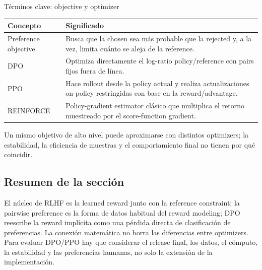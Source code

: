 \begin{knowledgebox}{Términos clave: objective y optimizer}
\begin{tabularx}{\textwidth}{L{0.18\textwidth} X}
\toprule
Concepto & Significado \\
\midrule
Preference objective & Busca que la chosen sea más probable que la rejected y, a la vez, limita cuánto se aleja de la reference. \\
DPO & Optimiza directamente el log-ratio policy/reference con pairs fijos fuera de línea. \\
PPO & Hace rollout desde la policy actual y realiza actualizaciones on-policy restringidas con base en la reward/advantage. \\
REINFORCE & Policy-gradient estimator clásico que multiplica el retorno muestreado por el score-function gradient. \\
\bottomrule
\end{tabularx}
Un mismo objetivo de alto nivel puede aproximarse con distintos optimizers; la estabilidad, la eficiencia de muestras y el comportamiento final no tienen por qué coincidir.
\end{knowledgebox}


\subsection{Resumen de la sección}

El núcleo de RLHF es la learned reward junto con la reference constraint; la pairwise preference es la forma de datos habitual del reward modeling; DPO reescribe la reward implícita como una pérdida directa de clasificación de preferencias. La conexión matemática no borra las diferencias entre optimizers. Para evaluar DPO/PPO hay que considerar el release final, los datos, el cómputo, la estabilidad y las preferencias humanas, no solo la extensión de la implementación.
